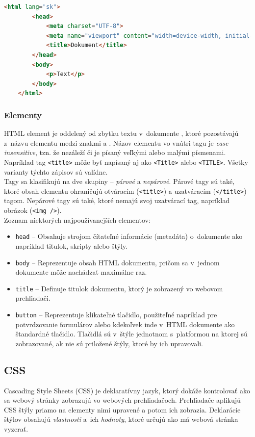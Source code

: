\begin{lstlisting}[language=HTML, caption=Príklad jednoduchej HTML štruktúry.]
	<html lang="sk">
		<head>
			<meta charset="UTF-8">
			<meta name="viewport" content="width=device-width, initial-scale=1.0">
			<title>Dokument</title>
		</head>
		<body>
			<p>Text</p>
		</body>
	</html>
\end{lstlisting}

\subsubsection{Elementy}
HTML element je oddelený od zbytku textu v~dokumente , ktoré pozostávajú z~názvu elementu medzi znakmi \uv{\texttt{<}} a \uv{\texttt{>}}. Názov elementu vo vnútri tagu je \emph{case insensitive}, tzn. že nezáleží či je písaný veľkými alebo malými písmenami. Napríklad tag \texttt{<title>} môže byť napísaný aj ako \texttt{<Title>} alebo \texttt{<TITLE>}. Všetky varianty týchto zápisov sú valídne. \cite{MDN} \\

\noindent Tagy sa klasifikujú na dve skupiny -- \emph{párové} a \emph{nepárové}. Párové tagy sú také, ktoré obsah elementu ohraničujú otváracím (\texttt{<title>}) a uzatváracím (\texttt{</title>}) tagom. Nepárové tagy sú také, ktoré nemajú svoj uzatvárací tag, napríklad obrázok (\texttt{<img />}). \\

\noindent Zoznam niektorých najpoužívanejších elementov:
\begin{itemize}
	\item \texttt{head} -- Obsahuje strojom čítateľné informácie (metadáta) o~dokumente ako napríklad titulok, skripty alebo štýly. \cite{MDN}
	\item \texttt{body} -- Reprezentuje obsah HTML dokumentu, pričom sa v~jednom dokumente môže nachádzať maximálne raz. \cite{MDN}
	\item \texttt{title} -- Definuje titulok dokumentu, ktorý je zobrazený vo webovom prehliadači. \cite{MDN}
	\item \texttt{button} -- Reprezentuje klikateľné tlačidlo, použiteľné napríklad pre potvrdzovanie formulárov alebo kdekoľvek inde v~HTML dokumente ako štandardné tlačidlo. Tlačidlá sú v~štýle jednotnom s~platformou na ktorej sú zobrazované, ak nie sú priložené štýly, ktoré by ich upravovali. \cite{MDN}
\end{itemize}

\subsection{CSS}
Cascading Style Sheets (CSS) je deklaratívny jazyk, ktorý dokáže kontrolovať ako sa webový stránky zobrazujú vo webových prehliadačoch. Prehliadače aplikujú CSS štýly priamo na elementy nimi upravené a potom ich zobrazia. Deklarácie štýlov obsahujú \emph{vlastnosti} a~ich \emph{hodnoty}, ktoré určujú ako má webová stránka vyzerať. \cite{MDN} \\

